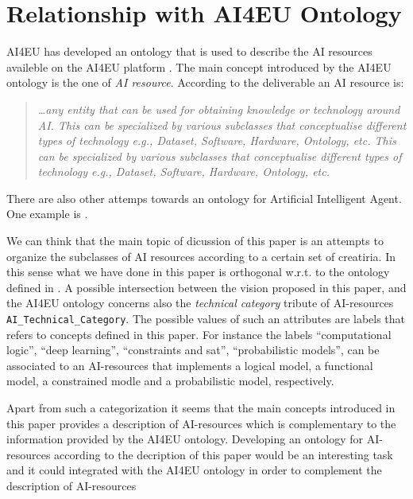 \section{Relationship with AI4EU Ontology}

AI4EU has developed an ontology that is used to describe the AI
resources availeble on the AI4EU platform \cite{ai4eu-D3.4}. 
The main concept introduced by the AI4EU ontology is the one of \emph{AI
  resource}. According to the deliverable an AI resource is:

\begin{quote}\it
\dots any entity that can be used for obtaining knowledge or
technology around AI. This can be specialized by various subclasses
that conceptualise different types of technology e.g., Dataset,
Software, Hardware, Ontology, etc. This can be specialized by various
subclasses that conceptualise different types of technology e.g.,
Dataset, Software, Hardware, Ontology, etc.
\end{quote}

There are also other attemps towards an ontology for Artificial
Intelligent Agent. One example is \cite{hawley2019challenges}. 


We can think that the main topic of dicussion of this paper is an
attempts to organize the subclasses of AI resources according to a
certain set of creatiria. In this sense what we have done in this
paper is orthogonal w.r.t. to the ontology defined in
\cite{ai4eu-D3}. A possible intersection between the vision
proposed in this paper, and the AI4EU ontology concerns also the
\emph{technical category}
tribute of AI-resources \texttt{AI\_Technical\_Category}. The possible
values of such an attributes are labels that refers to concepts
defined in this paper. For instance the labels ``computational logic'',
``deep learning'', ``constraints and sat'', ``probabilistic models'',
can be associated to an AI-resources that implements a logical model,
a functional model, a constrained modle and a probabilistic model,
respectively.

Apart from such a categorization it seems that the main concepts
introduced in this paper provides a description of AI-resources which
is complementary to the information provided by the AI4EU ontology.
Developing an ontology for AI-resources according to the decription of
this paper would be an interesting task and it could integrated with
the AI4EU ontology in order to complement the description of
AI-resources 

